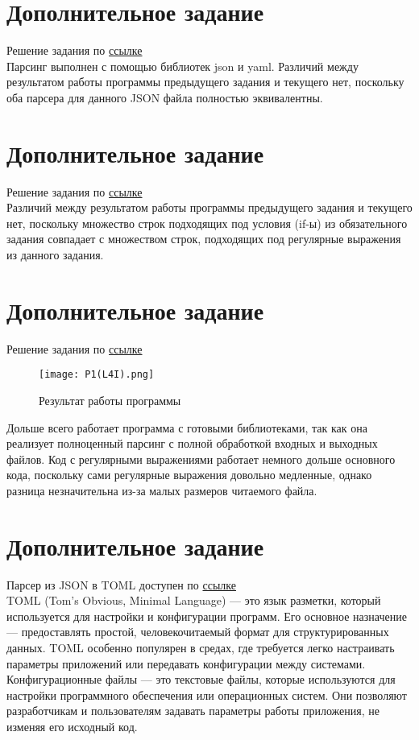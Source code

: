 \section{Дополнительное задание }
Решение задания по \href{https://github.com/evgrart/ITMO/blob/main/informatics/labs/lab4/task1.py}{ссылке} \\
Парсинг выполнен с помощью библиотек json и yaml. Различий между результатом работы программы предыдущего задания и текущего нет, поскольку оба парсера для данного JSON файла полностью эквивалентны.
\section{Дополнительное задание }
Решение задания по \href{https://github.com/evgrart/ITMO/blob/main/informatics/labs/lab4/task2.py}{ссылке} \\
Различий между результатом работы программы
предыдущего задания и текущего нет, поскольку множество строк подходящих под условия (if-ы) из обязательного задания совпадает с множеством строк, подходящих под регулярные выражения из данного задания. 
\section{Дополнительное задание }
Решение задания по \href{https://github.com/evgrart/ITMO/blob/main/informatics/labs/lab4/task4.py}{ссылке} \\
\begin{figure}[H]
    \centering
    \texttt{[image: P1(L4I).png]}
    \caption{Результат работы программы}
\end{figure}
\noindent Дольше всего работает программа с готовыми библиотеками, так как она реализует полноценный парсинг с полной обработкой входных и выходных файлов. Код с регулярными выражениями работает немного дольше основного кода, поскольку сами регулярные выражения довольно медленные, однако разница незначительна из-за малых размеров читаемого файла.
\section{Дополнительное задание }
Парсер из JSON в TOML доступен по \href{https://github.com/evgrart/ITMO/blob/main/informatics/labs/lab4/test5.py}{ссылке} \\
TOML (Tom's Obvious, Minimal Language) — это язык разметки, который используется для настройки и конфигурации программ. Его основное назначение — предоставлять простой, человекочитаемый формат для структурированных данных. TOML особенно популярен в средах, где требуется легко настраивать параметры приложений или передавать конфигурации между системами. \\
Конфигурационные файлы — это текстовые файлы, которые используются для настройки программного обеспечения или операционных систем. Они позволяют разработчикам и пользователям задавать параметры работы приложения, не изменяя его исходный код. 
